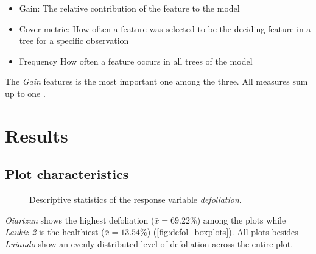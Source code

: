 \documentclass[review]{elsarticle}
\begin{document}
\begin{itemize}
	\item Gain: The relative contribution of the feature to the model
	\item Cover metric: How often a feature was selected to be the deciding feature in a tree for a specific observation
	\item Frequency How often a feature occurs in all trees of the model
\end{itemize}

\noindent The \textit{Gain} features is the most important one among the three.
All measures sum up to one \citep{chenXGBoostScalableTree2016}.


\section{Results}

\subsection{Plot characteristics}

\begin{figure} [t!]
	\begin{center}
		\caption{Descriptive statistics of the response variable \textit{defoliation}.}
		\label{fig:defol_boxplots}
	\end{center}
\end{figure}

\noindent \textit{Oiartzun} shows the highest defoliation ($\bar{x} = 69.22 \%$) among the plots while \textit{Laukiz 2} is the healthiest ($\bar{x} = 13.54 \%$) (\autoref{fig:defol_boxplots}).
All plots besides \textit{Luiando} show an evenly distributed level of defoliation across the entire plot.
\end{document}
